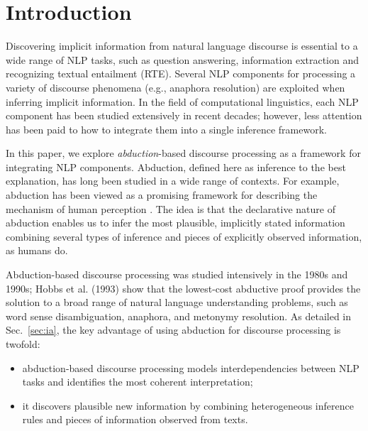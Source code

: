 \documentclass[english]{jnlp_1.4}
\begin{document}
\maketitle

\section{Introduction}

Discovering implicit information from natural language discourse is
essential to a wide range of NLP tasks, such as question answering,
information extraction and recognizing textual entailment (RTE). Several NLP
components for processing a variety of discourse phenomena (e.g., anaphora resolution) are exploited when inferring
implicit information. In the field of computational linguistics, each
NLP component has been studied extensively in recent decades; however,
less attention has been paid to how to integrate them into a single
inference framework.

In this paper, we explore \emph{abduction}-based discourse processing
as a framework for integrating NLP components. Abduction, defined here as
inference to the best explanation, has long been studied in a wide
range of contexts. For example, abduction has been viewed as a
promising framework for describing the mechanism of human perception
\cite{Charniak91,Hobbs93,Shanahan05,Peraldi07}. The idea is that
the declarative nature of abduction enables us to infer the most
plausible, implicitly stated information combining several types of
inference and pieces of explicitly observed information, as humans
do. 

Abduction-based discourse processing was studied intensively in
the 1980s and 1990s; Hobbs et al. (1993)\nocite{Hobbs93} show that the
lowest-cost abductive proof provides the solution to a broad range of
natural language understanding problems, such as word sense
disambiguation, anaphora, and metonymy resolution. As detailed in
Sec.~\ref{sec:ia}, the key advantage of using abduction for discourse
processing is twofold:
\begin{itemize}
\item abduction-based discourse processing models interdependencies
between NLP tasks and identifies the most coherent interpretation;
\item it discovers plausible new information by combining
heterogeneous inference rules and pieces of information
observed from texts.
\end{itemize}
\end{document}
